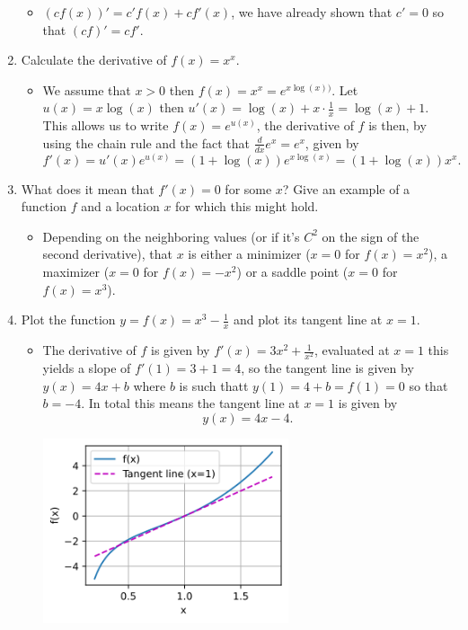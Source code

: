 \documentclass{article}
\begin{document}
\begin{enumerate}
	\begin{itemize}
	\item $(cf(x))' = c' f(x) + c f'(x)$, we have already shown that $c' = 0$ so that $(cf)' = cf'$.
	\end{itemize}
\item Calculate the derivative of $f(x) = x^x$. 
	\begin{itemize}
	\item We assume that $x > 0$ then $f(x) = x^x = e^{x \log(x))}$. Let $u(x) = x \log(x)$ then $u'(x) = \log(x) + x \cdot \frac{1}{x} = \log(x) + 1$. This allows us to write $f(x) = e^{u(x)}$, the derivative of $f$ is then, by using the chain rule and the fact that $\frac{d}{dx} e^x = e^x$, given by
	$$
	f'(x) = u'(x) e^{u(x)} = (1 + \log(x))e^{x \log(x)} = (1 + \log(x))x^x.
	$$
	\end{itemize}
\item What does it mean that $f'(x) = 0$ for some $x$? Give an example of a function $f$ and a location $x$ for which this might hold.
	\begin{itemize}
	\item Depending on the neighboring values (or if it's $C^2$ on the sign of the second derivative), that $x$ is either a minimizer ($x = 0$ for $f(x) = x^2$), a maximizer ($x = 0$ for $f(x) = -x^2$) or a saddle point ($x = 0$ for $f(x) = x^3$).
	\end{itemize}
\item Plot the function $y = f(x) = x^3 - \frac{1}{x}$ and plot its tangent line at $x = 1$.
	\begin{itemize}
	\item The derivative of $f$ is given by $f'(x) = 3x^2 + \frac{1}{x^2}$, evaluated at $x = 1$ this yields a slope of $f'(1) = 3 + 1 = 4$, so the tangent line is given by $y(x) = 4x + b$ where $b$ is such thatt $y(1) = 4 + b = f(1) = 0$ so that $b = -4$. In total this means the tangent line at $x = 1$ is given by
	$$
	y(x) = 4x - 4.
	$$
	\begin{center}
    	\includegraphics[width=0.6\textwidth]{Images/4_6.png}

\end{center}
\end{itemize}
\end{enumerate}
\end{document}
